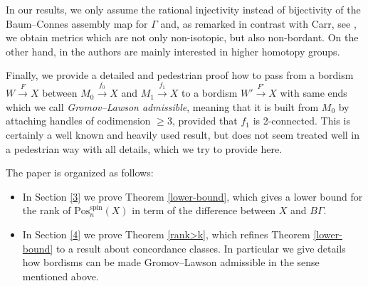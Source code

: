 \documentclass[10pt,a4paper]{amsart}
\numberwithin{equation}{section}
\DeclareMathOperator{\spin}{spin}
\begin{document}
 In our results, we only assume the
 rational injectivity instead of bijectivity of the Baum--Connes assembly map
 for $\Gamma$ and, as remarked in contrast with Carr, see \cite{Carr}, we obtain metrics
 which are not only non-isotopic, but also non-bordant. On the other hand, in
 \cite{EbertRW} the authors are mainly interested in higher homotopy
 groups.

 Finally, we provide a detailed and pedestrian proof how to pass from a bordism $W\xrightarrow{F}X$ between
 $M_0\xrightarrow{f_0}X$ and $M_1\xrightarrow{f_1}X$ to a bordism
 $W'\xrightarrow{F'}X$ with same ends which we call \emph{Gromov--Lawson
 admissible}, meaning that it is built from $M_0$ by attaching
 handles of codimension $\ge 3$, provided that
 $f_1$ is 2-connected. This is certainly a well known and heavily used
 result, but does not seem treated well in a pedestrian way with all details,
 which we try to provide here.

 The paper is organized as follows:
 \begin{itemize}\itemsep=0pt
\item In Section \ref{3} we prove Theorem \ref{lower-bound}, which gives a lower bound for the rank of $\mathrm{Pos}^{\spin}_{n}(X)$ in term of the difference between $X$ and $B\Gamma$.
 \item In Section \ref{4} we prove Theorem \ref{rank>k}, which refines
 Theorem \ref{lower-bound} to a result about concordance classes. In
 particular we give details how bordisms can
 be made Gromov--Lawson admissible in the sense mentioned above.
 \end{itemize}
\end{document}
